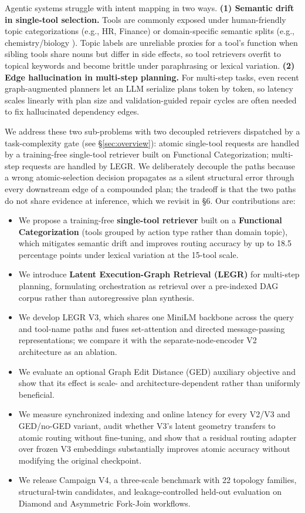 \documentclass{article}
\begin{document}
Agentic systems struggle with intent mapping in two ways. \textbf{(1) Semantic drift in single-tool selection.} Tools are commonly exposed under human-friendly topic categorizations (e.g., HR, Finance) or domain-specific semantic splits (e.g., chemistry/biology \cite{ding2025scitoolagent}). Topic labels are unreliable proxies for a tool's function when sibling tools share nouns but differ in side effects, so tool retrievers overfit to topical keywords and become brittle under paraphrasing or lexical variation. \textbf{(2) Edge hallucination in multi-step planning.} For multi-step tasks, even recent graph-augmented planners \cite{chen2026gtool,xiu2026optgraph} let an LLM serialize plans token by token, so latency scales linearly with plan size and validation-guided repair cycles are often needed to fix hallucinated dependency edges.

We address these two sub-problems with two decoupled retrievers dispatched by a task-complexity gate (see \S\ref{sec:overview}): atomic single-tool requests are handled by a training-free single-tool retriever built on Functional Categorization; multi-step requests are handled by LEGR. We deliberately decouple the paths because a wrong atomic-selection decision propagates as a silent structural error through every downstream edge of a compounded plan; the tradeoff is that the two paths do not share evidence at inference, which we revisit in \S6. Our contributions are:
\begin{itemize}
    \item We propose a training-free \textbf{single-tool retriever} built on a \textbf{Functional Categorization} (tools grouped by action type rather than domain topic), which mitigates semantic drift and improves routing accuracy by up to 18.5 percentage points under lexical variation at the 15-tool scale.
    \item We introduce \textbf{Latent Execution-Graph Retrieval (LEGR)} for multi-step planning, formulating orchestration as retrieval over a pre-indexed DAG corpus rather than autoregressive plan synthesis.
    \item We develop LEGR V3, which shares one MiniLM backbone across the query and tool-name paths and fuses set-attention and directed message-passing representations; we compare it with the separate-node-encoder V2 architecture as an ablation.
    \item We evaluate an optional Graph Edit Distance (GED) auxiliary objective and show that its effect is scale- and architecture-dependent rather than uniformly beneficial.
    \item We measure synchronized indexing and online latency for every V2/V3 and GED/no-GED variant, audit whether V3's latent geometry transfers to atomic routing without fine-tuning, and show that a residual routing adapter over frozen V3 embeddings substantially improves atomic accuracy without modifying the original checkpoint.
    \item We release Campaign V4, a three-scale benchmark with 22 topology families, structural-twin candidates, and leakage-controlled held-out evaluation on Diamond and Asymmetric Fork-Join workflows.
\end{itemize}
\end{document}
